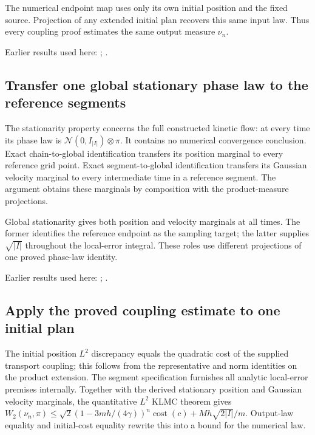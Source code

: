 \documentclass[11pt,a4paper]{report}
\begin{document}
The numerical endpoint map uses only its own initial position and the fixed source. Projection of any extended initial plan recovers this same input law. Thus every coupling proof estimates the same output measure \(\nu_n\).



Earlier results used here: \cite[Section~3.17.1]{LangevinLean2026ULASC}; \cite[Section~3.17.2]{LangevinLean2026ULASC}.
\subsection{\texorpdfstring{Transfer one global stationary phase law to the reference segments}{Transfer one global stationary phase law to the reference segments}}
\label{report-step-KineticLangevin-GenericCanonicalKLMC-lean-15}


The stationarity property concerns the full constructed kinetic flow: at every time its phase law is \(\mathcal N(0,I_{|I|})\otimes\pi\). It contains no numerical convergence conclusion. Exact chain-to-global identification transfers its position marginal to every reference grid point. Exact segment-to-global identification transfers its Gaussian velocity marginal to every intermediate time in a reference segment. The argument obtains these marginals by composition with the product-measure projections.



Global stationarity gives both position and velocity marginals at all times. The former identifies the reference endpoint as the sampling target; the latter supplies \(\sqrt{|I|}\) throughout the local-error integral. These roles use different projections of one proved phase-law identity.



Earlier results used here: \cite[Section~3.17.1]{LangevinLean2026ULASC}; \cite[Section~3.22.6]{LangevinLean2026ULASC}.
\subsection{\texorpdfstring{Apply the proved coupling estimate to one initial plan}{Apply the proved coupling estimate to one initial plan}}
\label{report-step-KineticLangevin-GenericCanonicalKLMC-lean-16}


The initial position \(L^{2}\) discrepancy equals the quadratic cost of the supplied transport coupling; this follows from the representative and norm identities on the product extension. The segment specification furnishes all analytic local-error premises internally. Together with the derived stationary position and Gaussian velocity marginals, the quantitative \(L^{2}\) KLMC theorem gives \(W_2(\nu_n,\pi)\le\sqrt2(1-3mh/(4\gamma))^n\operatorname{cost}(c)+Mh\sqrt{2|I|}/m\). Output-law equality and initial-cost equality rewrite this into a bound for the numerical law.
\end{document}
